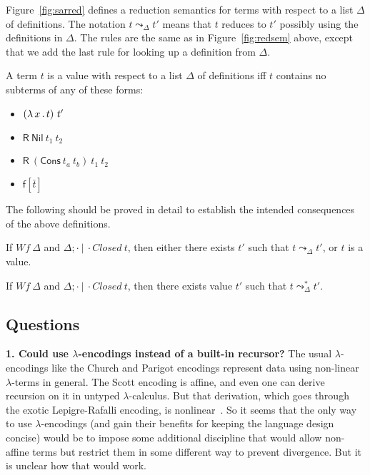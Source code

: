 \documentclass{article}
\begin{document}
Figure~\ref{fig:sarred} defines a reduction semantics for terms with
respect to a list $\Delta$ of definitions.  The notation $t \leadsto_\Delta t'$ means
that $t$ reduces to $t'$ possibly using the definitions in $\Delta$.  The rules are the same as in
Figure~\ref{fig:redsem} above, except that we add the last rule for
looking up a definition from $\Delta$.  


\begin{definition}
  A term $t$ is a value with respect to a list $\Delta$ of definitions iff $t$ contains no subterms of any of these forms:
  \begin{itemize}
  \item $(\lambda\, x\, .\, t)\ t'$
  \item $\mathsf{R}\ \mathsf{Nil}\ t_1\ t_2$
  \item $\mathsf{R}\ (\mathsf{Cons}\ t_a\ t_b)\ t_1\ t_2$
  \item $\mathsf{f}[\bar{t}]$
  \end{itemize}
\end{definition}

The following should be proved in detail to establish the intended consequences of the above definitions.

\begin{proposition}[Safety]
  If $\textit{Wf}\ \Delta$ and $\Delta;\cdot\ |\ \cdot \textit{Closed}\ t$,
  then either there exists $t'$ such that $t \leadsto_\Delta t'$, or
  $t$ is a value.
\end{proposition}

\begin{proposition}[Normalization]
  If $\textit{Wf}\ \Delta$ and $\Delta;\cdot\ |\ \cdot \textit{Closed}\ t$,
  then there exists value $t'$ such that $t \leadsto_\Delta^* t'$.
\end{proposition}

\subsection{Questions}

\textbf{1. Could \sar use $\lambda$-encodings instead of a built-in
  recursor?}  The usual $\lambda$-encodings like the Church and
Parigot encodings represent data using non-linear $\lambda$-terms in
general.  The Scott encoding is affine, and even one can derive
recursion on it in untyped $\lambda$-calculus.  But that derivation,
which goes through the exotic Lepigre-Rafalli encoding, is
nonlinear~\cite[Section 7]{jenkins+21}.  So it seems that the only way
to use $\lambda$-encodings (and gain their benefits for keeping the
language design concise) would be to impose some additional discipline
that would allow non-affine terms but restrict them in some different
way to prevent divergence.  But it is unclear how that would work.
\end{document}
